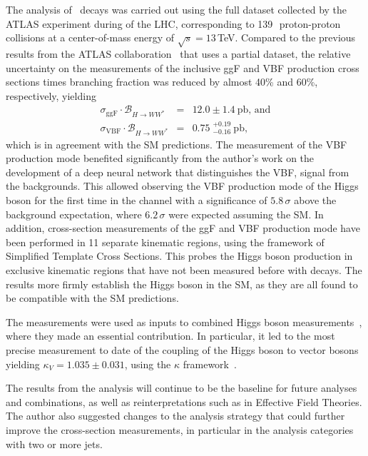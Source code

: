 The analysis of \HWW\ decays was carried out using the full dataset collected by the ATLAS experiment during \RunTwo of the LHC, corresponding to 139\,\ifb\ proton-proton collisions at a center-of-mass energy of $\sqrt{s} = 13\,$TeV. 
Compared to the previous results from the ATLAS collaboration~\cite{HIGG-2016-07} that uses a partial \RunTwo dataset, the relative uncertainty on the measurements of the inclusive ggF and VBF production cross sections times branching fraction was reduced by almost 40\% and 60\%, respectively, yielding 
\begin{eqnarray*}
    \sigma_{\mathrm{ggF}} \cdot \mathcal{B}_{H \to WW^{\ast}} &=& 12.0 \pm 1.4~\mathrm{pb}, \,\text{and} \\
    \sigma_{\mathrm{VBF}} \cdot \mathcal{B}_{H \to WW^{\ast}} &=& 0.75\;^{+0.19}_{-0.16}~\mathrm{pb},
\end{eqnarray*}
which is in agreement with the SM predictions.
The measurement of the VBF production mode benefited significantly from the author's work on the development of a deep neural network that distinguishes the VBF, \HWW signal from the backgrounds.
This allowed observing the VBF production mode of the Higgs boson for the first time in the \HWW channel with a significance of $5.8\,\sigma$ above the background expectation, where $6.2\,\sigma$ were expected assuming the SM.
In addition, cross-section measurements of the ggF and VBF production mode have been performed in 11 separate kinematic regions, using the framework of Simplified Template Cross Sections. This probes the Higgs boson production in exclusive kinematic regions that have not been measured before with \HWW decays.
The results more firmly establish the Higgs boson in the SM, as they are all found to be compatible with the SM predictions.

The measurements were used as inputs to combined Higgs boson measurements~\cite{NaturePaper}, where they made an essential contribution. 
In particular, it led to the most precise measurement to date of the coupling of the Higgs boson to vector bosons yielding $\kappa_{V} = 1.035 \pm 0.031$, using the $\kappa$ framework~\cite{LHCHandbookV3}.

The results from the \HWW analysis will continue to be the baseline for future analyses and combinations, as well as reinterpretations such as in Effective Field Theories.
The author also suggested changes to the analysis strategy that could further improve the \HWW cross-section measurements, in particular in the analysis categories with two or more jets.

